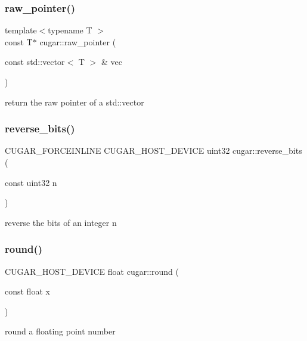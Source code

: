 \subsubsection{\texorpdfstring{raw\+\_\+pointer()}{raw\_pointer()}\hspace{0.1cm}{\footnotesize\ttfamily [3/3]}}
{\footnotesize\ttfamily template$<$typename T $>$ \\
const T$\ast$ cugar\+::raw\+\_\+pointer (\begin{DoxyParamCaption}\item[{const std\+::vector$<$ T $>$ \&}]{vec }\end{DoxyParamCaption})}

return the raw pointer of a std\+::vector \mbox{\label{group___basic_ga731aa073264ceb5396fc95800295bd0a}} 
\subsubsection{\texorpdfstring{reverse\+\_\+bits()}{reverse\_bits()}}
{\footnotesize\ttfamily C\+U\+G\+A\+R\+\_\+\+F\+O\+R\+C\+E\+I\+N\+L\+I\+NE C\+U\+G\+A\+R\+\_\+\+H\+O\+S\+T\+\_\+\+D\+E\+V\+I\+CE uint32 cugar\+::reverse\+\_\+bits (\begin{DoxyParamCaption}\item[{const uint32}]{n }\end{DoxyParamCaption})}

reverse the bits of an integer n \mbox{\label{group___basic_gaea9bbfe8e98f49d1754e26b52b37f9e2}} 
\subsubsection{\texorpdfstring{round()}{round()}}
{\footnotesize\ttfamily C\+U\+G\+A\+R\+\_\+\+H\+O\+S\+T\+\_\+\+D\+E\+V\+I\+CE float cugar\+::round (\begin{DoxyParamCaption}\item[{const float}]{x }\end{DoxyParamCaption})\hspace{0.3cm}{\ttfamily [inline]}}

round a floating point number \mbox{\label{group___basic_gab1b928f43d089426870dc0afd011395c}} 
